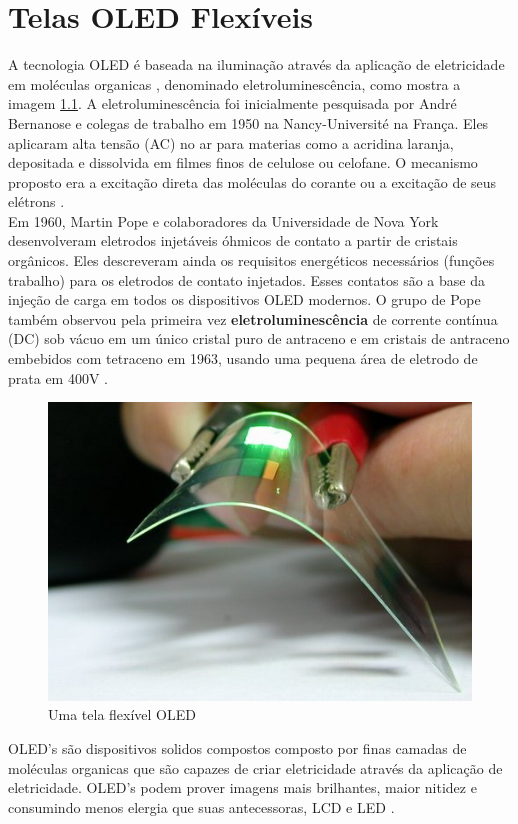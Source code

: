 \chapter{Telas OLED Flexíveis}
\label{cap:oled}

A tecnologia OLED é baseada na iluminação através da aplicação de eletricidade em moléculas organicas \cite{HSWOLED}, denominado    eletroluminescência, como mostra a imagem \ref{fig:oled_early_product}. A eletroluminescência foi inicialmente pesquisada por André Bernanose e colegas de trabalho em 1950 na Nancy-Université na França. Eles aplicaram alta tensão (AC) no ar para materias como a acridina laranja, depositada e dissolvida em filmes finos de celulose ou celofane. O mecanismo proposto era a excitação direta das moléculas do corante ou a excitação de seus elétrons \cite{WikipediaOLED}.\\

Em 1960, Martin Pope e colaboradores da Universidade de Nova York desenvolveram eletrodos injetáveis óhmicos de contato a partir de cristais orgânicos. Eles descreveram ainda os requisitos energéticos necessários (funções trabalho) para os eletrodos de contato injetados. Esses contatos são a base da injeção de carga em todos os dispositivos OLED modernos. O grupo de Pope também observou pela primeira vez {\bf eletroluminescência} de corrente contínua (DC) sob vácuo em um único cristal puro de antraceno e em cristais de antraceno embebidos com tetraceno em 1963, usando uma pequena área de eletrodo de prata em 400V \cite{WikipediaOLED}.\\

\begin{figure}[!ht]
  \centering
  \includegraphics[width=.40\textwidth]{./figuras/oled_early_product} 
  \caption{Uma tela flexível OLED}
  \label{fig:oled_early_product} 
\end{figure}

OLED's são dispositivos solidos compostos composto por finas camadas de moléculas organicas que são capazes de criar eletricidade através da aplicação de eletricidade. OLED's podem prover imagens mais brilhantes, maior nitidez e consumindo menos elergia que suas antecessoras, LCD e LED \cite{HSWOLED}.\\

